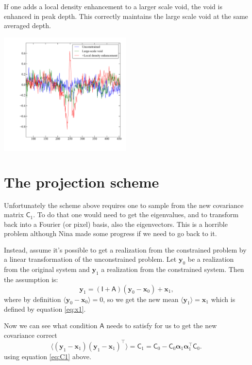 \documentclass[11pt,a4paper,preprint]{aastex}
\newcommand{\bmath}[1]{\ensuremath{\bm{#1}}}
\renewcommand{\vec}[1]{\bmath{#1}}
\begin{document}
If one adds a local density enhancement to a larger scale void, the
void is enhanced in peak depth. This correctly maintains the large scale void at
the same averaged depth.

\begin{center}
\includegraphics[width=0.5\textwidth]{figs/HR-demo.pdf}
\end{center}


\section{The projection scheme}

Unfortunately the scheme above requires one to sample from the new
covariance matrix $\mathsf{C}_1$. To do that one would need to get the
eigenvalues, and to transform back into a Fourier (or pixel) basis,
also the eigenvectors. This is a horrible problem although Nina made
some progress if we need to go back to it.

Instead, assume it's possible to get a realization from the
constrained problem by a linear transformation of the unconstrained
problem. Let $\vec{y}_0$ be a realization from the original system and
$\vec{y}_1$ a realization from the constrained system. Then the
assumption is:
\begin{equation}
\vec{y}_1 = (\mathsf{I} + \mathsf{A}) (\vec{y}_0-\vec{x}_0) + \vec{x}_1\textrm{,}\label{eq:y1}
\end{equation}
where by definition $\langle \vec{y}_0 - \vec{x}_0\rangle=0$, so we get the new
mean $\langle \vec{y}_1 \rangle = \vec{x}_1$ which is defined by
equation \eqref{eq:x1}.

Now we can see what condition $\mathsf{A}$ needs to satisfy for us to
get the new covariance correct
\begin{equation}
\langle (\vec{y}_1-\vec{x}_1) (\vec{y}_1-\vec{x}_1)^{\top} \rangle =
\mathsf{C}_1 =
\mathsf{C}_0 - \mathsf{C}_0 \vec{\alpha}_1 \vec{\alpha}_1^{\top} \mathsf{C}_0
\textrm{.}
\end{equation}
using equation \eqref{eq:C1} above.
\end{document}
